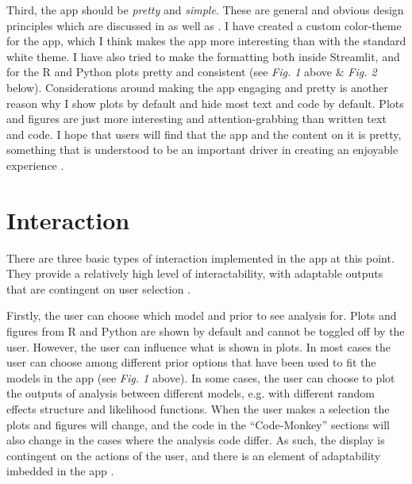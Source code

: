 \documentclass[12pt]{article}
\begin{document}
\vspace{5mm}

Third, the app should be \emph{pretty} and \emph{simple}. These are general
and obvious design principles which are discussed in
\textcite{tractinsky2000beautiful} as well as
\textcite[25-26]{hassenzahl2010experience}.
I have created a custom color-theme for the app, which I think makes the app more interesting
than with the standard white theme. I have also tried to make the formatting both inside
Streamlit, and for the R and Python plots pretty and consistent (see \emph{Fig.
1} above \& \emph{Fig. 2} below). Considerations around making
the app engaging
and pretty is another reason why I show plots by default and hide most text and code by default.
Plots and figures are just more interesting and attention-grabbing than
written text and code.
I hope that users will find that the app and the content on it is pretty,
something that is understood to be an important driver
in creating an enjoyable experience \autocite[65]{hassenzahl2010experience}.

\section{Interaction}
There are three basic types of interaction implemented in the app
at this point. They provide a relatively high level of
interactability, with adaptable outputs that are contingent on
user selection \autocite{janlert2017meaning}.

\vspace{5mm}

Firstly, the user can choose which model and prior to see analysis for.
Plots and figures from R and Python are shown by default and cannot be toggled off by the user.
However, the user can influence what is shown in plots. In most cases the user can choose
among different prior options that have been used to fit the models in the app
(see \emph{Fig. 1} above).
In some cases, the user can choose to plot the outputs of analysis between different models,
e.g. with different random effects structure and likelihood functions.
When the user makes a selection the plots and figures will change,
and the code in the “Code-Monkey” sections will also change in the cases where
the analysis code differ.
As such, the display is contingent on the actions of the user,
and there is an element of adaptability imbedded in the
app \autocite{janlert2017meaning}.


\vspace{5mm}
\end{document}
